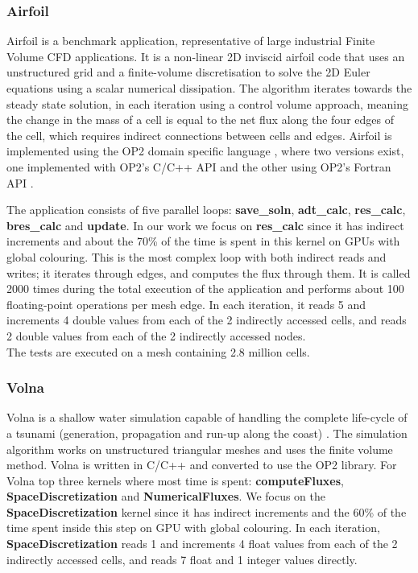 \subsubsection{Airfoil}
Airfoil is a benchmark application, representative of
large industrial Finite Volume CFD applications. It is a non-linear 2D inviscid
airfoil code that uses an unstructured grid and a finite-volume discretisation
to solve the 2D Euler equations using a scalar numerical dissipation. The
algorithm iterates towards the steady state solution, in each iteration using a
control volume approach, meaning the change in the mass of a cell is equal to
the net flux along the four edges of the cell, which requires indirect
connections between cells and edges. Airfoil is implemented using the OP2 domain
specific language \cite{op2}, where two versions exist, one implemented with
OP2's C/C++ API and the other using OP2's Fortran API
\cite{giles2012op2,op2-repo}.

The application consists of five parallel loops: \textbf{save\_soln},
\textbf{adt\_calc}, \textbf{res\_calc}, \textbf{bres\_calc} and \textbf{update}.
In our work we focus on \textbf{res\_calc} since it has indirect increments and
about the 70\% of the time is spent in this kernel on GPUs with global
colouring.  This is the most complex loop with both indirect reads and writes; it
iterates through edges, and computes the flux through them. It is called 2000
times during the total execution of the application and performs about 100
floating-point operations per mesh edge. In each iteration, it reads 5 and
increments 4 double values from each of the 2 indirectly accessed cells, and
reads 2 double values from each of the 2 indirectly accessed nodes.
\\
 The tests are executed on a mesh containing 2.8 million cells.

\subsubsection{Volna}
Volna is a shallow water simulation capable of handling the complete life-cycle
of a tsunami (generation, propagation and run-up along the coast)
\cite{dutykh2011volna}. The simulation algorithm works on unstructured
triangular meshes and uses the finite volume method. Volna is written in C/C++
and converted to use the OP2 library\cite{op2}. For Volna top three kernels
where most time is spent: \textbf{computeFluxes}, \textbf{SpaceDiscretization}
and \textbf{NumericalFluxes}. We focus on the \textbf{SpaceDiscretization}
kernel since it has indirect increments and the 60\% of the time spent inside
this step on GPU with global colouring. In each iteration,
\textbf{SpaceDiscretization} reads 1 and increments 4 float values from each of
the 2 indirectly accessed cells, and reads 7 float and 1 integer values directly.

